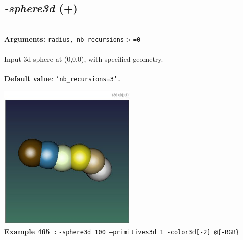 \documentclass[a4paper,11pt,twoside]{book}
\begin{document}
\subsection{\emph{-sphere3d} (+)}\vspace*{-0.5em}
~\\\textbf{Arguments: } 
{\small \texttt{radius,\_nb\_recursions$>$=0}}\\~\\
Input 3d sphere at (0,0,0), with specified geometry.
~\\~\\\textbf{Default value}: {\small \texttt{'nb\_recursions=3'.}}
\begin{center}\includegraphics[keepaspectratio=true,height=7cm,width=\textwidth]{img/gmic_def465.jpg}\\
{\footnotesize \textbf{Example 465~:} \texttt{-sphere3d 100 --primitives3d 1  -color3d[-2] @\{-RGB\}}}
\end{center}
\end{document}
